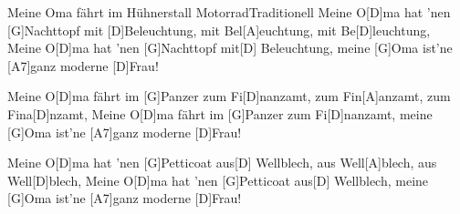 \documentclass[../main.tex]{subfiles}
\begin{document}
\begin{song}{Meine Oma fährt im Hühnerstall Motorrad}{Traditionell}{}
Meine O[D]ma hat ’nen [G]Nachttopf mit [D]Beleuchtung, mit Bel[A]euchtung, mit Be[D]leuchtung,
Meine O[D]ma hat ’nen [G]Nachttopf mit[D] Beleuchtung, meine [G]Oma ist’ne [A7]ganz moderne [D]Frau!

Meine O[D]ma fährt im [G]Panzer zum Fi[D]nanzamt, zum Fin[A]anzamt, zum Fina[D]nzamt,
Meine O[D]ma fährt im [G]Panzer zum Fi[D]nanzamt, meine [G]Oma ist’ne [A7]ganz moderne [D]Frau!

Meine O[D]ma hat ’nen [G]Petticoat aus[D] Wellblech, aus Well[A]blech, aus Well[D]blech,
Meine O[D]ma hat ’nen [G]Petticoat aus[D] Wellblech, meine [G]Oma ist’ne [A7]ganz moderne [D]Frau!
\end{song}
\end{document}
